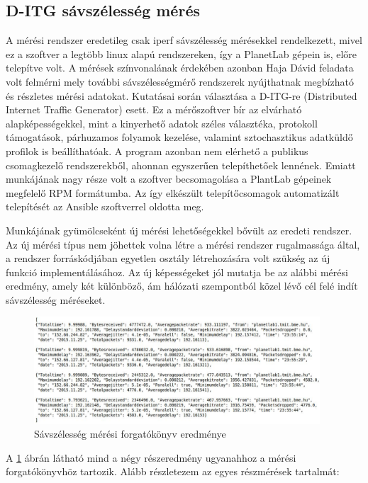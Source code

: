 \subsection*{D-ITG sávszélesség mérés}
A mérési rendszer eredetileg csak iperf sávszélesség mérésekkel rendelkezett, mivel ez a szoftver a legtöbb linux alapú rendszereken, így a PlanetLab gépein is, előre telepítve volt. A mérések színvonalának érdekében azonban Haja Dávid feladata volt felmérni mely további sávszélességmérő rendszerek nyújthatnak megbízható és részletes mérési adatokat. Kutatásai során választása a D-ITG-re (Distributed Internet Traffic Generator) esett. Ez a mérőszoftver bír az elvárható alapképességekkel, mint a kinyerhető adatok széles választéka, protokoll támogatások, párhuzamos folyamok kezelése, valamint sztochasztikus adatküldő profilok is beállíthatóak. A program azonban nem elérhető a publikus csomagkezelő rendszerekből, ahonnan egyszerűen telepíthetőek lennének. Emiatt munkájának nagy része volt a szoftver becsomagolása a PlantLab gépeinek megfelelő RPM formátumba. 
Az így elkészült telepítőcsomagok automatizált telepítését az Ansible szoftverrel oldotta meg.

Munkájának gyümölcseként új mérési lehetőségekkel bővült az eredeti rendszer. Az új mérési típus nem jöhettek volna létre a mérési rendszer rugalmassága által, a rendszer forráskódjában egyetlen osztály létrehozására volt szükség az új funkció implementálásához. Az új képességeket jól mutatja be az alábbi mérési eredmény, amely két különböző, ám hálózati szempontból közel lévő cél felé indít sávszélesség méréseket. 

\begin{figure}[!ht]
	\centering
	\includegraphics[width=0.95\textwidth, keepaspectratio]{figures/d-itg-measure.PNG}
	\caption{Sávszélesség mérési forgatókönyv eredménye}
	\label{fig:d-itg-measure}
\end{figure}

\newpage

A \ref{fig:d-itg-measure} ábrán látható mind a négy részeredmény ugyanahhoz a mérési forgatókönyvhöz tartozik. Alább részletezem az egyes részmérések tartalmát:

